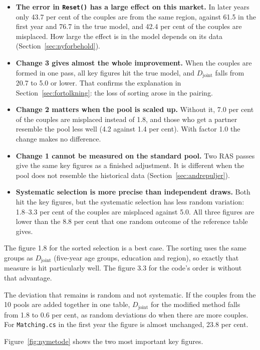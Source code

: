 \documentclass[12pt,a4paper]{article}
\newcommand{\kode}[1]{\texttt{#1}}
\begin{document}
\begin{itemize}
\item \textbf{The error in \kode{Reset()} has a large effect on this market.} In later years only
43.7 per cent of the couples are from the same region, against 61.5 in the first year and 76.7 in
the true model, and 42.4 per cent of the couples are misplaced. How large the effect is in the
model depends on its data (Section~\ref{sec:nyforbehold}).
\item \textbf{Change 3 gives almost the whole improvement.} When the couples are formed in one
pass, all key figures hit the true model, and $D_{\text{joint}}$ falls from 20.7 to 5.0 or lower.
That confirms the explanation in Section~\ref{sec:fortolkning}: the loss of sorting arose in the
pairing.
\item \textbf{Change 2 matters when the pool is scaled up.} Without it, 7.0 per cent of the couples
are misplaced instead of 1.8, and those who get a partner resemble the pool less well (4.2 against
1.4 per cent). With factor 1.0 the change makes no difference.
\item \textbf{Change 1 cannot be measured on the standard pool.} Two RAS passes give the same key
figures as a finished adjustment. It is different when the pool does not resemble the historical
data (Section~\ref{sec:andrepuljer}).
\item \textbf{Systematic selection is more precise than independent draws.} Both hit the key
figures, but the systematic selection has less random variation: 1.8--3.3 per cent of the couples
are misplaced against 5.0. All three figures are lower than the 8.8 per cent that one random
outcome of the reference table gives.
\end{itemize}

The figure 1.8 for the sorted selection is a best case. The sorting uses the same groups as
$D_{\text{joint}}$ (five-year age groups, education and region), so exactly that measure is hit
particularly well. The figure 3.3 for the code's order is without that advantage.

The deviation that remains is random and not systematic. If the couples from the 10 pools are added
together in one table, $D_{\text{joint}}$ for the modified method falls from 1.8 to 0.6 per cent,
as random deviations do when there are more couples. For \kode{Matching.cs} in the first year the
figure is almost unchanged, 23.8 per cent.

Figure~\ref{fig:nymetode} shows the two most important key figures.
\end{document}
